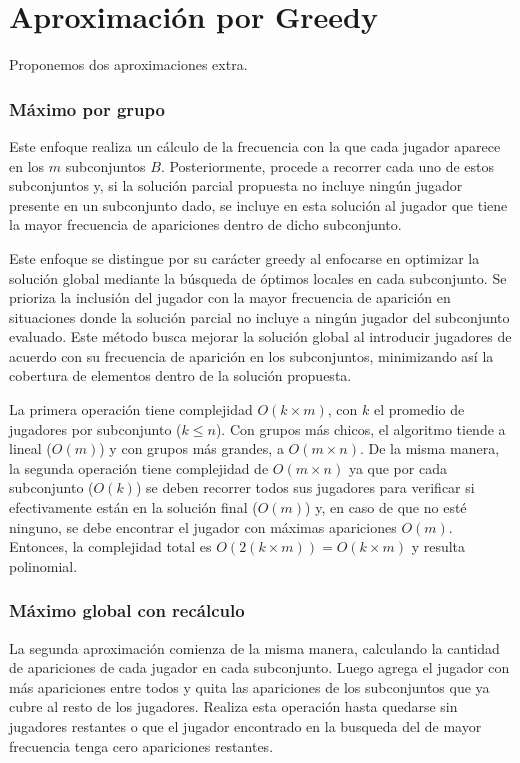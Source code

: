 \section{Aproximación por Greedy}

Proponemos dos aproximaciones extra.

\subsubsection{Máximo por grupo}
Este enfoque realiza un cálculo de la frecuencia con la que cada jugador aparece en los $m$ subconjuntos $B$. Posteriormente, procede a recorrer cada uno de estos subconjuntos y, si la solución parcial propuesta no incluye ningún jugador presente en un subconjunto dado, se incluye en esta solución al jugador que tiene la mayor frecuencia de apariciones dentro de dicho subconjunto.

Este enfoque se distingue por su carácter greedy al enfocarse en optimizar la solución global mediante la búsqueda de óptimos locales en cada subconjunto. Se prioriza la inclusión del jugador con la mayor frecuencia de aparición en situaciones donde la solución parcial no incluye a ningún jugador del subconjunto evaluado. Este método busca mejorar la solución global al introducir jugadores de acuerdo con su frecuencia de aparición en los subconjuntos, minimizando así la cobertura de elementos dentro de la solución propuesta.



La primera operación tiene complejidad $O(k \times m)$, con $k$ el promedio de jugadores por subconjunto ($k \leq n$). Con grupos más chicos, el algoritmo tiende a lineal ($O(m)$) y con grupos más grandes, a $O(m\times n)$. 
De la misma manera, la segunda operación tiene complejidad de  $O(m\times n)$ ya que por cada subconjunto ($O(k)$) se deben recorrer todos sus jugadores para verificar si efectivamente están en la solución final ($O(m)$) y, en caso de que no esté ninguno, se debe encontrar el jugador con máximas apariciones $O(m)$. Entonces, la complejidad total es $O(2(k \times m))=O(k \times m)$ y resulta polinomial.

\subsubsection{Máximo global con recálculo}

La segunda aproximación comienza de la misma manera, calculando la cantidad de apariciones de cada jugador en cada subconjunto. Luego agrega el jugador con más apariciones entre todos y quita las apariciones de los subconjuntos que ya cubre al resto de los jugadores. Realiza esta operación hasta quedarse sin jugadores restantes o que el jugador encontrado en la busqueda del de mayor frecuencia tenga cero apariciones restantes.

